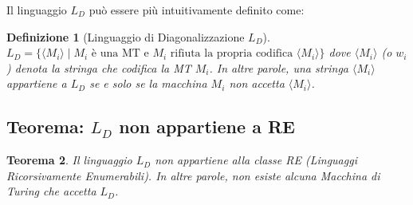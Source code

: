 \documentclass[a4paper, 11pt]{book} %
\newtheorem{theorem}{Teorema}[section]
\newtheorem{definition}[theorem]{Definizione}
\theoremstyle{definition}
\begin{document}
Il linguaggio $L_D$ può essere più intuitivamente definito come:
\begin{definition}[Linguaggio di Diagonalizzazione $L_D$]
$L_D = \{ \langle M_i \rangle \mid M_i \text{ è una MT e } M_i \text{ rifiuta la propria codifica } \langle M_i \rangle \}$
dove $\langle M_i \rangle$ (o $w_i$) denota la stringa che codifica la MT $M_i$.
In altre parole, una stringa $\langle M_i \rangle$ appartiene a $L_D$ se e solo se la macchina $M_i$ non accetta $\langle M_i \rangle$.
\end{definition}

\subsection{Teorema: $L_D$ non appartiene a RE}

\begin{theorem}
Il linguaggio $L_D$ non appartiene alla classe RE (Linguaggi Ricorsivamente Enumerabili). In altre parole, non esiste alcuna Macchina di Turing che accetta $L_D$.
\end{theorem}
\end{document}
